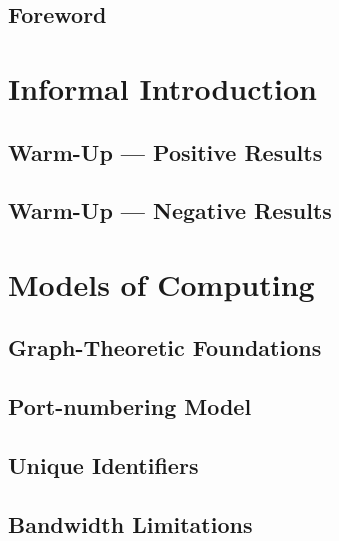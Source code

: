 





\frontmatter
\maketitle
\tableofcontents

\chapter*{Foreword}


\mainmatter
\part{Informal Introduction}

\chapter{Warm-Up --- Positive Results}


\chapter{Warm-Up --- Negative Results}


\part{Models of Computing}

\chapter{Graph-Theoretic Foundations}


\chapter{Port-numbering Model}\label{ch:pn}


\chapter{Unique Identifiers}\label{ch:local}


\chapter{Bandwidth Limitations}\label{ch:congest}


